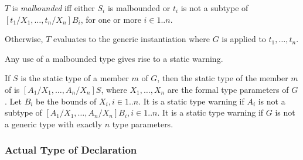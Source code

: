 \documentclass{article}
\begin{document}
\LMHash{}
$T$ is {\em malbounded} if{}f either $S_i$ is malbounded or $t_i$ is not a subtype of
$[t_1/X_1, \ldots, t_n/X_n]B_i$,
for one or more $i \in 1 .. n$.

%
%

\LMHash{}
Otherwise, $T$ evaluates to the generic instantiation where $G$ is applied to $t_1, \ldots, t_n$.


\LMHash{}
Any use of a malbounded type gives rise to a static warning.

\LMHash{}
If $S$ is the static type of a member $m$ of $G$,
then the static type of the member $m$ of
is
$[A_1/X_1, \ldots, A_n/X_n]S$,
where $X_1, \ldots, X_n$ are the formal type parameters of $G$.
Let $B_i$ be the bounds of $X_i, i \in 1 .. n$.
It is a static type warning if $A_i$ is not a subtype of
$[A_1/X_1, \ldots, A_n/X_n]B_i, i \in 1 .. n$.
It is a static type warning if $G$ is not a generic type with exactly $n$ type parameters.


\subsubsection{Actual Type of Declaration}

%
\end{document}
